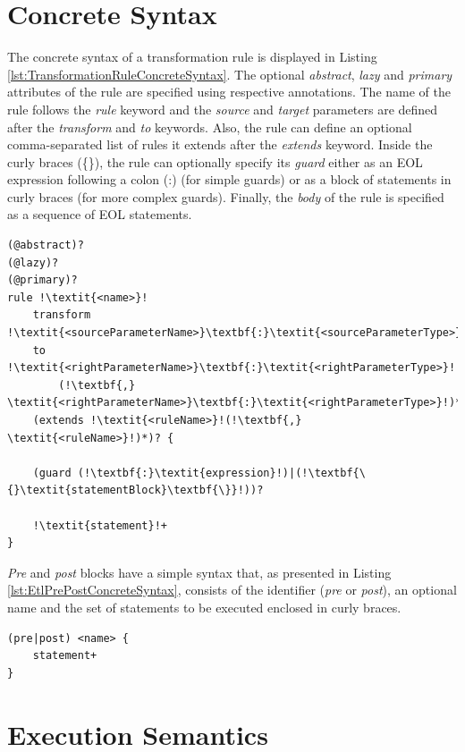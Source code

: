 \section{Concrete Syntax}

The concrete syntax of a transformation rule is displayed in Listing \ref{lst:TransformationRuleConcreteSyntax}. The optional \emph{abstract}, \emph{lazy} and \emph{primary} attributes of the rule are specified using respective annotations. The name of the rule follows the \emph{rule} keyword and the \emph{source} and \emph{target} parameters are defined after the \emph{transform} and \emph{to} keywords. Also, the rule can define an optional comma-separated list of rules it extends after the \emph{extends} keyword. Inside the curly braces (\{\}), the rule can optionally specify its \emph{guard} either as an EOL expression following a colon (:) (for simple guards) or as a block of statements in curly braces (for more complex guards). Finally, the \emph{body} of the rule is specified as a sequence of EOL statements.

\begin{lstlisting}[caption=Concrete Syntax of a TransformationRule, label=lst:TransformationRuleConcreteSyntax, language=ETL, escapechar=!]
(@abstract)?
(@lazy)?
(@primary)?
rule !\textit{<name>}!
	transform !\textit{<sourceParameterName>}\textbf{:}\textit{<sourceParameterType>}!
	to !\textit{<rightParameterName>}\textbf{:}\textit{<rightParameterType>}!
	    (!\textbf{,} \textit{<rightParameterName>}\textbf{:}\textit{<rightParameterType>}!)*
	(extends !\textit{<ruleName>}!(!\textbf{,} \textit{<ruleName>}!)*)? {
	
	(guard (!\textbf{:}\textit{expression}!)|(!\textbf{\{}\textit{statementBlock}\textbf{\}}!))?
	
	!\textit{statement}!+
}
\end{lstlisting}

\emph{Pre} and \emph{post} blocks have a simple syntax that, as presented in Listing \ref{lst:EtlPrePostConcreteSyntax}, consists of the identifier (\emph{pre} or \emph{post}), an optional name and the set of statements to be executed enclosed in curly braces.

\begin{lstlisting}[caption=Concrete Syntax of Pre and Post blocks, label=lst:EtlPrePostConcreteSyntax, language=ETL]
(pre|post) <name> {
	statement+
}
\end{lstlisting}

\section{Execution Semantics}
\label{sec:ETL.ExecutionSemantics}

